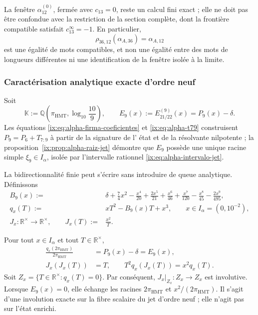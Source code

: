 La fenêtre \(\alpha_{12}^{(0)}\), fermée avec \(c_{13}=0\), reste un
calcul fini exact ; elle ne doit pas être confondue avec la restriction de la section
complète, dont la frontière compatible satisfait \(c_{13}^{\infty}=-1\). En
particulier,
\begin{equation}
 \rho_{36,12}(\alpha_{A,36})=\alpha_{A,12}
 \label{ix:eq:alpha-rho-36-12-proyectiva}
\end{equation}
est une égalité de mots compatibles, et non une égalité entre des mots de
longueurs différentes ni une identification de la fenêtre isolée à la
limite.

\subsubsection{Caractérisation analytique exacte d'ordre neuf}

Soit
\[
 \mathbb K:=\mathbb Q\!\left(\pi_{\mathrm{HMT}},
                  \log_{10}\frac{10}{9}\right),
 \qquad
 E_9(x):=E_{21/22}^{(9)}(x)=P_9(x)-\delta .
\]
Les équations \eqref{ix:eq:alpha-firma-coeficientes} et
\eqref{ix:eq:alpha-t79} construisent \(P_9=P_6+T_{7:9}\) à partir de la signature de l'
état et de la résolvante nilpotente ; la
proposition~\ref{ix:prop:alpha-raiz-jet} démontre que \(E_9\) possède une unique
racine simple \(\xi_9\in I_\alpha\), isolée par l'intervalle rationnel
\eqref{ix:eq:alpha-intervalo-jet}.

La bidirectionnalité finie peut s'écrire sans introduire de queue
analytique. Définissons
\begin{align}
 B_9(x):={}&\delta+\frac74x^2-\frac{x^4}{20}
 +\frac{2x^5}{21}+\frac{x^6}{46}+\frac{x^7}{120}
 -\frac{x^8}{45}-\frac{2x^9}{495},
 \label{ix:eq:alpha-b9-finito}\\
 q_x(T):={}&xT^2-B_9(x)T+x^3,\qquad x\in I_\alpha=(0,10^{-2}),
 \label{ix:eq:alpha-q-involucion-finita}\\
 J_x:{\mathbb R}^{\times}\longrightarrow{\mathbb R}^{\times},
 \qquad J_x(T):={}&\frac{x^2}{T}.
\end{align}

\begin{proposition}
\label{ix:prop:alpha-involucion-finita-exacta}
Pour tout \(x\in I_\alpha\) et tout \(T\in\mathbb R^\times\),
\begin{align}
 \frac{q_x(2\pi_{\mathrm{HMT}})}{2\pi_{\mathrm{HMT}}}
 &=P_9(x)-\delta=E_9(x),
 \label{ix:eq:alpha-q-equivale-p9}\\
 J_x(J_x(T))&=T,
 \qquad
 T^2q_x(J_x(T))=x^2q_x(T).
 \label{ix:eq:alpha-j-involucion-exacta}
\end{align}
Soit \(Z_x=\{T\in\mathbb R^\times:q_x(T)=0\}\). Par conséquent,
\(J_x|_{Z_x}:Z_x\to Z_x\) est involutive. Lorsque \(E_9(x)=0\),
elle échange les racines \(2\pi_{\mathrm{HMT}}\) et
\(x^2/(2\pi_{\mathrm{HMT}})\). Il s'agit d'une involution exacte sur la fibre
scalaire du jet d'ordre neuf ; elle n'agit pas sur l'état enrichi.
\end{proposition}


